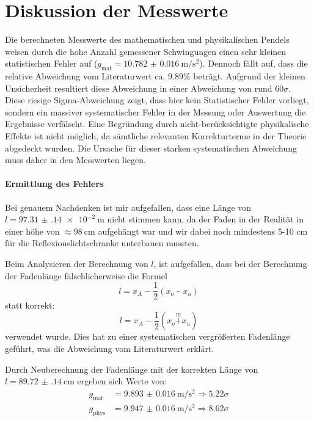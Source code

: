 \documentclass[12pt,a4paper,titlepage]{scrartcl}
\numberwithin{equation}{section}
\numberwithin{table}{section}
\numberwithin{figure}{section}
\begin{document}
\section{Diskussion der Messwerte}
Die berechneten Messwerte des mathematischen und physikalischen Pendels weisen durch die hohe Anzahl gemessener Schwingungen einen sehr kleinen statistischen Fehler auf ($g_\text{mat} = \qty{10.782(16)}{\meter\per\second\squared}$). Dennoch fällt auf, dass die relative Abweichung vom Literaturwert ca. $9.89\%$ beträgt. Aufgrund der kleinen Unsicherheit resultiert diese Abweichung in einer  Abweichung von rund $60\sigma$. Diese riesige Sigma-Abweichung zeigt, dass hier kein Statistischer Fehler vorliegt, sondern ein massiver systematischer Fehler in der Messung oder Auswertung die Ergebnisse verfälscht. Eine Begründung durch nicht-berücksichtigte physikalische Effekte ist nicht möglich, da sämtliche relevanten Korrekturterme in der Theorie abgedeckt wurden. Die Ursache für dieser starken systematischen Abweichung muss daher in den Messwerten liegen. 

\paragraph{Ermittlung des Fehlers}
Bei genauem Nachdenken ist mir aufgefallen, dass eine Länge von $l = \qty{97.31(14)e-2}{\meter}$ nicht stimmen kann, da der Faden in der Realität in einer höhe von $\approx \qty{98}{\centi\meter}$ aufgehängt war und wir dabei noch mindestens 5-10 cm für die Reflexionslichtschranke unterbauen mussten.

Beim Analysieren der Berechnung von $l$, ist aufgefallen, dass bei der Berechnung der Fadenlänge fälschlicherweise die Formel
\begin{equation}
    l = x_A - \frac{1}{2}\left(x_o \textbf{ - } x_u\right)
\end{equation}
statt korrekt: 
\begin{equation}
    l = x_A - \frac{1}{2}\left(x_o \overset{!!!}{+} x_u\right)
\end{equation}
verwendet wurde. Dies hat zu einer systematischen vergrößerten Fadenlänge
geführt, was die Abweichung vom Literaturwert erklärt. 

Durch Neuberechnung der Fadenlänge mit der korrekten Länge von $l = \qty{89.72(14)}{\centi\meter}$ ergeben sich Werte von:
\begin{align}
    g_\text{mat} &= \qty{9.893(16)}{\meter\per\second\squared} \Rightarrow 5.22\sigma \\
    g_\text{phys} &= \qty{9.947(16)}{\meter\per\second\squared} \Rightarrow 8.62\sigma
\end{align}
\end{document}
